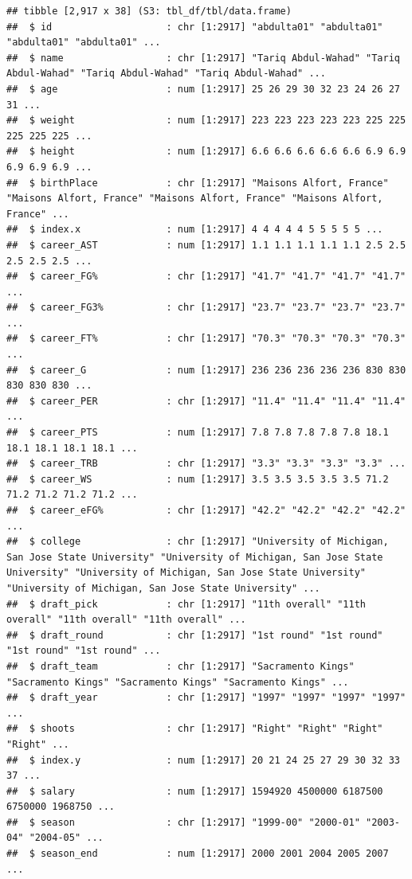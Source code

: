 \documentclass[
]{book}
\begin{document}
\begin{verbatim}
## tibble [2,917 x 38] (S3: tbl_df/tbl/data.frame)
##  $ id                    : chr [1:2917] "abdulta01" "abdulta01" "abdulta01" "abdulta01" ...
##  $ name                  : chr [1:2917] "Tariq Abdul-Wahad" "Tariq Abdul-Wahad" "Tariq Abdul-Wahad" "Tariq Abdul-Wahad" ...
##  $ age                   : num [1:2917] 25 26 29 30 32 23 24 26 27 31 ...
##  $ weight                : num [1:2917] 223 223 223 223 223 225 225 225 225 225 ...
##  $ height                : num [1:2917] 6.6 6.6 6.6 6.6 6.6 6.9 6.9 6.9 6.9 6.9 ...
##  $ birthPlace            : chr [1:2917] "Maisons Alfort, France" "Maisons Alfort, France" "Maisons Alfort, France" "Maisons Alfort, France" ...
##  $ index.x               : num [1:2917] 4 4 4 4 4 5 5 5 5 5 ...
##  $ career_AST            : num [1:2917] 1.1 1.1 1.1 1.1 1.1 2.5 2.5 2.5 2.5 2.5 ...
##  $ career_FG%            : chr [1:2917] "41.7" "41.7" "41.7" "41.7" ...
##  $ career_FG3%           : chr [1:2917] "23.7" "23.7" "23.7" "23.7" ...
##  $ career_FT%            : chr [1:2917] "70.3" "70.3" "70.3" "70.3" ...
##  $ career_G              : num [1:2917] 236 236 236 236 236 830 830 830 830 830 ...
##  $ career_PER            : chr [1:2917] "11.4" "11.4" "11.4" "11.4" ...
##  $ career_PTS            : num [1:2917] 7.8 7.8 7.8 7.8 7.8 18.1 18.1 18.1 18.1 18.1 ...
##  $ career_TRB            : chr [1:2917] "3.3" "3.3" "3.3" "3.3" ...
##  $ career_WS             : num [1:2917] 3.5 3.5 3.5 3.5 3.5 71.2 71.2 71.2 71.2 71.2 ...
##  $ career_eFG%           : chr [1:2917] "42.2" "42.2" "42.2" "42.2" ...
##  $ college               : chr [1:2917] "University of Michigan, San Jose State University" "University of Michigan, San Jose State University" "University of Michigan, San Jose State University" "University of Michigan, San Jose State University" ...
##  $ draft_pick            : chr [1:2917] "11th overall" "11th overall" "11th overall" "11th overall" ...
##  $ draft_round           : chr [1:2917] "1st round" "1st round" "1st round" "1st round" ...
##  $ draft_team            : chr [1:2917] "Sacramento Kings" "Sacramento Kings" "Sacramento Kings" "Sacramento Kings" ...
##  $ draft_year            : chr [1:2917] "1997" "1997" "1997" "1997" ...
##  $ shoots                : chr [1:2917] "Right" "Right" "Right" "Right" ...
##  $ index.y               : num [1:2917] 20 21 24 25 27 29 30 32 33 37 ...
##  $ salary                : num [1:2917] 1594920 4500000 6187500 6750000 1968750 ...
##  $ season                : chr [1:2917] "1999-00" "2000-01" "2003-04" "2004-05" ...
##  $ season_end            : num [1:2917] 2000 2001 2004 2005 2007 ...

\end{verbatim}
\end{document}
